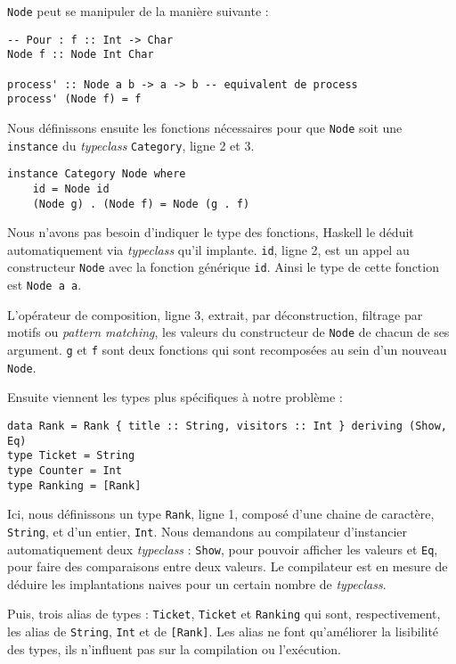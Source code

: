 \documentclass{llncs}
\begin{document}
\lstinline{Node} peut se manipuler de la manière suivante :
\begin{lstlisting}
-- Pour : f :: Int -> Char
Node f :: Node Int Char

process' :: Node a b -> a -> b -- equivalent de process
process' (Node f) = f
\end{lstlisting}

Nous définissons ensuite les fonctions nécessaires pour que \lstinline{Node} soit
une \lstinline{instance} du \emph{typeclass} \lstinline{Category}, ligne 2 et 3.

\begin{lstlisting}
instance Category Node where
    id = Node id
    (Node g) . (Node f) = Node (g . f)
\end{lstlisting}

Nous n'avons pas besoin d'indiquer le type des fonctions, Haskell le déduit automatiquement
via \emph{typeclass} qu'il implante.
\lstinline{id}, ligne 2, est un appel au constructeur \lstinline{Node} avec la
fonction générique \lstinline{id}.
Ainsi le type de cette fonction est \lstinline{Node a a}.

L'opérateur de composition, ligne 3, extrait, par déconstruction, filtrage par motifs
ou \emph{pattern matching}, les valeurs du constructeur de \lstinline{Node} de chacun de ses argument.
\lstinline{g} et \lstinline{f} sont deux fonctions qui sont recomposées au sein
d'un nouveau \lstinline{Node}.

Ensuite viennent les types plus spécifiques à notre problème :

\begin{lstlisting}
data Rank = Rank { title :: String, visitors :: Int } deriving (Show, Eq)
type Ticket = String
type Counter = Int
type Ranking = [Rank]
\end{lstlisting}

Ici, nous définissons un type \lstinline{Rank}, ligne 1,
composé d'une chaine de caractère, \lstinline{String}, et d'un entier, \lstinline{Int}.
Nous demandons au compilateur d'instancier automatiquement deux \emph{typeclass} :
\lstinline{Show}, pour pouvoir afficher les valeurs et \lstinline{Eq},
pour faire des comparaisons entre deux valeurs.
Le compilateur est en mesure de déduire les implantations naives pour un certain
nombre de \emph{typeclass}.

Puis, trois alias de types : \lstinline{Ticket}, \lstinline{Ticket} et
\lstinline{Ranking} qui sont, respectivement, les alias de \lstinline{String},
\lstinline{Int} et de \lstinline{[Rank]}.
Les alias ne font qu'améliorer la lisibilité des types, ils n'influent pas sur
la compilation ou l'exécution.
\end{document}
